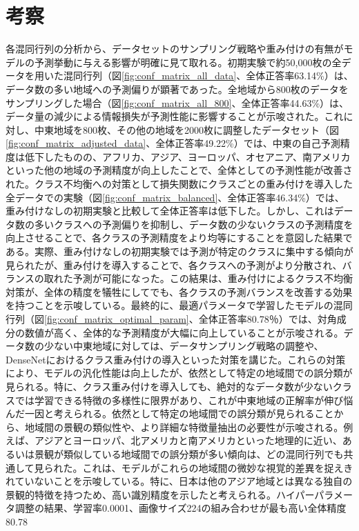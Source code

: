 \documentclass[a4paper, 11pt, titlepage]{jsarticle}
\begin{document}
\section{考察}各混同行列の分析から、データセットのサンプリング戦略や重み付けの有無がモデルの予測挙動に与える影響が明確に見て取れる。初期実験で約50,000枚の全データを用いた混同行列（図\ref{fig:conf_matrix_all_data}、全体正答率63.14\%）は、データ数の多い地域への予測偏りが顕著であった。全地域から800枚のデータをサンプリングした場合（図\ref{fig:conf_matrix_all_800}、全体正答率44.63\%）は、データ量の減少による情報損失が予測性能に影響することが示唆された。これに対し、中東地域を800枚、その他の地域を2000枚に調整したデータセット（図\ref{fig:conf_matrix_adjusted_data}、全体正答率49.22\%）では、中東の自己予測精度は低下したものの、アフリカ、アジア、ヨーロッパ、オセアニア、南アメリカといった他の地域の予測精度が向上したことで、全体としての予測性能が改善された。クラス不均衡への対策として損失関数にクラスごとの重み付けを導入した全データでの実験（図\ref{fig:conf_matrix_balanced}、全体正答率46.34\%）では、重み付けなしの初期実験と比較して全体正答率は低下した。しかし、これはデータ数の多いクラスへの予測偏りを抑制し、データ数の少ないクラスの予測精度を向上させることで、各クラスの予測精度をより均等にすることを意図した結果である。実際、重み付けなしの初期実験では予測が特定のクラスに集中する傾向が見られたが、重み付けを導入することで、各クラスへの予測がより分散され、バランスの取れた予測が可能になった。この結果は、重み付けによるクラス不均衡対策が、全体の精度を犠牲にしてでも、各クラスの予測バランスを改善する効果を持つことを示唆している。最終的に、最適パラメータで学習したモデルの混同行列（図\ref{fig:conf_matrix_optimal_param}、全体正答率80.78％）では、対角成分の数値が高く、全体的な予測精度が大幅に向上していることが示唆される。データ数の少ない中東地域に対しては、データサンプリング戦略の調整や、DenseNetにおけるクラス重み付けの導入といった対策を講じた。これらの対策により、モデルの汎化性能は向上したが、依然として特定の地域間での誤分類が見られる。特に、クラス重み付けを導入しても、絶対的なデータ数が少ないクラスでは学習できる特徴の多様性に限界があり、これが中東地域の正解率が伸び悩んだ一因と考えられる。依然として特定の地域間での誤分類が見られることから、地域間の景観の類似性や、より詳細な特徴量抽出の必要性が示唆される。例えば、アジアとヨーロッパ、北アメリカと南アメリカといった地理的に近い、あるいは景観が類似している地域間での誤分類が多い傾向は、どの混同行列でも共通して見られた。これは、モデルがこれらの地域間の微妙な視覚的差異を捉えきれていないことを示唆している。特に、日本は他のアジア地域とは異なる独自の景観的特徴を持つため、高い識別精度を示したと考えられる。ハイパーパラメータ調整の結果、学習率0.0001、画像サイズ224の組み合わせが最も高い全体精度80.78%
\end{document}
